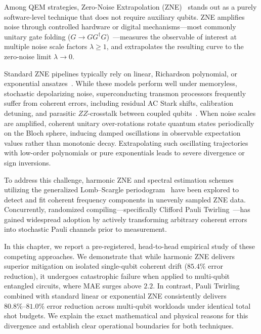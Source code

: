 Among QEM strategies, Zero-Noise Extrapolation (ZNE)~\cite{temme2017,li2017,kandala2019} stands out as a purely software-level technique that does not require auxiliary qubits. ZNE amplifies noise through controlled hardware or digital mechanisms---most commonly unitary gate folding ($G \to G G^\dagger G$)~\cite{giurgica2020}---measures the observable of interest at multiple noise scale factors $\lambda \ge 1$, and extrapolates the resulting curve to the zero-noise limit $\lambda \to 0$.

Standard ZNE pipelines typically rely on linear, Richardson polynomial, or exponential ansatzes~\cite{temme2017,giurgica2020}. While these models perform well under memoryless, stochastic depolarizing noise, superconducting transmon processors frequently suffer from coherent errors, including residual AC Stark shifts, calibration detuning, and parasitic $ZZ$-crosstalk between coupled qubits~\cite{kandala2019,hashim2021}. When noise scales are amplified, coherent unitary over-rotations rotate quantum states periodically on the Bloch sphere, inducing damped oscillations in observable expectation values rather than monotonic decay. Extrapolating such oscillating trajectories with low-order polynomials or pure exponentials leads to severe divergence or sign inversions.

To address this challenge, harmonic ZNE and spectral estimation schemes utilizing the generalized Lomb--Scargle periodogram~\cite{lomb1976,scargle1982} have been explored to detect and fit coherent frequency components in unevenly sampled ZNE data. Concurrently, randomized compiling---specifically Clifford Pauli Twirling~\cite{wallman2016,hashim2021}---has gained widespread adoption by actively transforming arbitrary coherent errors into stochastic Pauli channels prior to measurement.

In this chapter, we report a pre-registered, head-to-head empirical study of these competing approaches. We demonstrate that while harmonic ZNE delivers superior mitigation on isolated single-qubit coherent drift ($85.4\%$ error reduction), it undergoes catastrophic failure when applied to multi-qubit entangled circuits, where MAE surges above $2.2$. In contrast, Pauli Twirling combined with standard linear or exponential ZNE consistently delivers $80.8\%\text{--}81.0\%$ error reduction across multi-qubit workloads under identical total shot budgets. We explain the exact mathematical and physical reasons for this divergence and establish clear operational boundaries for both techniques.

